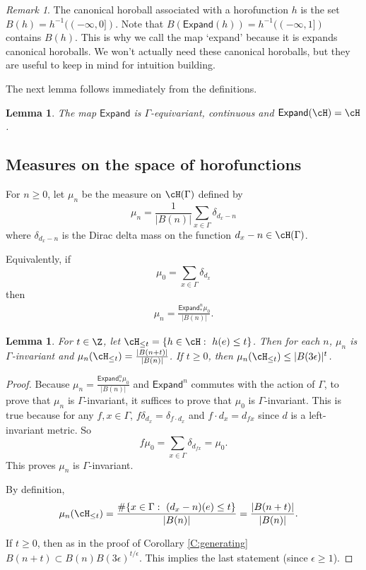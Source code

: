 \documentclass[12pt]{article}
\theoremstyle{plain}
\newtheorem{lem}[thm]{Lemma}
\theoremstyle{definition}
\theoremstyle{remark}
\newtheorem{remark}{Remark}
\newcommand{\G}{\Gamma}
\newcommand{\eps}{\epsilon}
\renewcommand\d{\delta}
\newcommand{\Add}{\mathsf{Expand}}
\newcommand\Expand{{\mathsf{Expand}}}
\begin{document}
\begin{remark}
The canonical horoball associated with a horofunction $h$ is the set $B(h)=h^{-1}((-\infty,0])$. Note that $B(\Expand(h))=h^{-1}((-\infty,1])$ contains $B(h)$. This is why we call the map `expand' because it is expands canonical horoballs. We won't actually need these canonical horoballs, but they are useful to keep in mind for intuition building. 
 \end{remark}
The next lemma follows immediately from the definitions.
\begin{lem}\label{L:expand-properties}
    The map $\Add$ is $\G$-equivariant, continuous and $\Add(\cH)=\cH$.
\end{lem}

\subsection{Measures on the space of horofunctions}\label{S:metric-measures}

For $n \ge 0$, let $\mu_{n}$ be the measure on $\cH(\G)$ defined by
$$\mu_{n} = \frac{1}{|B(n)|} \sum_{x\in \G} \d_{d_x-n}$$
where $\d_{d_x-n}$ is the Dirac delta mass on the function $d_x-n \in \cH(\G)$. 

Equivalently, if 
$$\mu_{0} = \sum_{x\in \G} \d_{d_x}$$
then 
\begin{align}\label{E:mu_n}
    \mu_{n} = \frac{\Add^n_{*}\mu_{0}}{|B(n)|}.
\end{align}


\begin{lem}\label{L:growth1}
For $t\in \Z$, let $\cH_{\leq t} = \{h\in \cH:~ h(e)\leq t\}$. Then for each $n$, $\mu_n$ is $\G$-invariant and $\mu_n(\cH_{\leq t}) = \frac{|B(n+t)|}{|B(n)|}$. If $t\ge 0$, then $\mu_n(\cH_{\leq t}) \le |B(3\eps)|^{t}$. 
\end{lem}

\begin{proof}
Because $\mu_{n} = \frac{\Add^n_{*}\mu_{0}}{|B(n)|}$ and $\Add^n$ commutes with the action of $\G$, to prove that $\mu_n$ is $\G$-invariant, it suffices to prove that $\mu_0$ is $\G$-invariant. 
This is true because for any $f,x\in \G$, $f \d_{d_x}=\d_{f\cdot d_x}$ and $f\cdot d_x = d_{fx}$ since $d$ is a left-invariant metric. 
So 
$$f \mu_0 = \sum_{x\in \G} \d_{d_{fx}} = \mu_0.$$
This proves $\mu_n$ is $\G$-invariant.

By definition,
\begin{align*}
   \mu_n(\cH_{\leq t}) &= \frac{\#\{x\in \G:~(d_x-n)(e)\leq t\}}{|B(n)|}=\frac{|B(n+t)|}{|B(n)|}. 
\end{align*}

If $t\ge 0$, then as in the proof of Corollary \ref{C:generating} $B(n+t) \subset B(n)B(3\eps)^{t/\eps}$. This implies the last statement (since $\eps\ge 1$). 
\end{proof}
\end{document}

